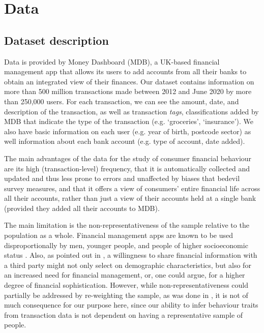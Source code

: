 
\section{Data}%
\label{sec:data}


\subsection{Dataset description}
\label{sub:dataset_description}
Data is provided by Money Dashboard (MDB), a UK-based
financial management app that allows its users to add accounts from all
their banks to obtain an integrated view of their finances. Our
dataset contains information on more than 500 million transactions made between
2012 and June 2020 by more than 250,000 users. For each transaction, we can see
the amount, date, and description of the transaction, as well as transaction
\textit{tags}, classifications added by MDB that indicate the type of the
transaction (e.g.  `groceries', `insurance'). We also have basic information
 on each user (e.g. year of birth, postcode sector) as well information about
each bank account (e.g. type of account, date added).

The main advantages of the data for the study of consumer financial behaviour
are its high (transaction-level) frequency, that it is automatically
collected and updated and thus less prone to errors and unaffected by biases
that bedevil survey measures, and that it offers a view of consumers' entire
financial life across all their accounts, rather than just a view of their
accounts held at a single bank (provided they added all their accounts to MDB).

The main limitation is the non-representativeness of the sample relative to the
population as a whole. Financial management apps are known to be used
disproportionally by men, younger people, and people of higher socioeconomic
status \citep{carlin2019generational,mas2014money}. Also, as pointed out in
\citet{gelman2014harnessing}, a willingness to share financial information with
a third party might not only select on demographic characteristics, but also
for an increased need for financial management, or, one could argue, for a
higher degree of financial sophistication. However, while
non-representativeness could partially be addressed by re-weighting the sample,
as was done in \citet{bourquin2020effects}, it is not of much consequence for
our purpose here, since our ability to infer behaviour traits from transaction
data is not dependent on having a representative sample of people.

